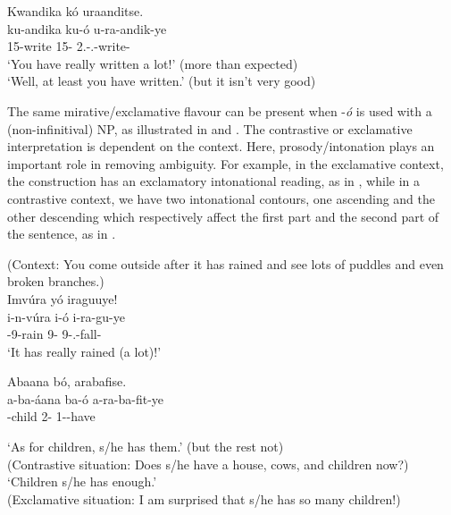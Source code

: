 \documentclass[output=paper]{langscibook}
\begin{document}
\z

\ea
\label{bkm:Ref75264568}
Kwandika kó uraanditse.\\
\gll
ku-andika  ku-ó  u-ra-andik-ye\\
15-write  15-\CM{}  2\SG.\SM-\PRS.\DJ{}-write-\PFV{}\\
\glt
‘You have really written a lot!’ (more than expected)\\
  ‘Well, at least you have written.’ (but it isn’t very good)


\z

The same mirative/exclamative flavour can be present when -\textit{ó} is used with a (non-infinitival) NP, as illustrated in  and . The contrastive or exclamative interpretation is dependent on the context. Here, prosody/intonation plays an important role in removing ambiguity. For example, in the exclamative context, the construction has an exclamatory intonational reading, as in , while in a contrastive context, we have two intonational contours, one ascending and the other descending which respectively affect the first part and the second part of the sentence, as in .

\ea
\label{bkm:Ref75263788}
(Context: You come outside after it has rained and see lots of puddles and even broken branches.)\\
Imvúra yó iraguuye!\\
\gll
i-n-vúra  i-ó  i-ra-gu-ye\\
\AUG{}-9-rain  9-\CM{}  9\SM-\PRS.\DJ{}-fall-\PFV{}\\
\glt
‘It has really rained (a lot)!’\\

\z

\ea
\label{bkm:Ref75263790}
Abaana bó, arabafise.\\
\gll
a-ba-áana  ba-ó  a-ra-ba-fit-ye\\
-child  2-\CM{}  1\SM-\OM{}-have\\
\glt

\ea
‘As for children, s/he has them.’ (but the rest not) \\
(Contrastive situation: Does s/he have a house, cows, and children now?)
\ex ‘Children s/he has enough.’\\
(Exclamative situation: I am surprised that s/he has so many children!)
\z
\z
\end{document}
